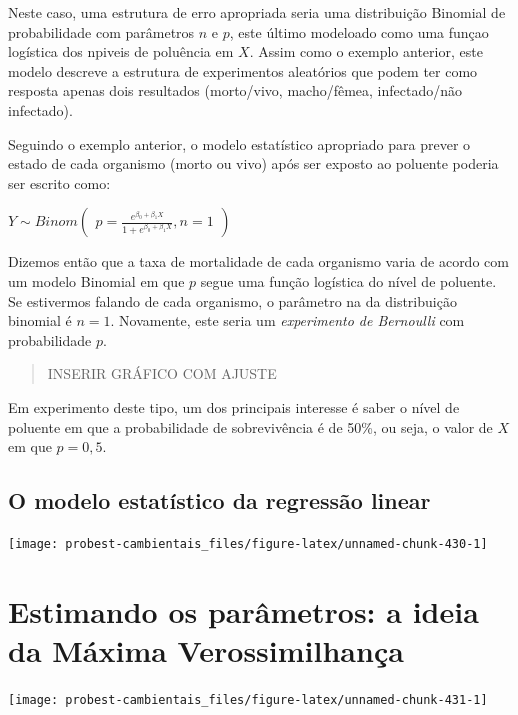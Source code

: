 \documentclass[
]{book}
\begin{document}
Neste caso, uma estrutura de erro apropriada seria uma distribuição Binomial de probabilidade com parâmetros \(n\) e \(p\), este último modeloado como uma funçao logística dos npiveis de poluência em \(X\). Assim como o exemplo anterior, este modelo descreve a estrutura de experimentos aleatórios que podem ter como resposta apenas dois resultados (morto/vivo, macho/fêmea, infectado/não infectado).

Seguindo o exemplo anterior, o modelo estatístico apropriado para prever o estado de cada organismo (morto ou vivo) após ser exposto ao poluente poderia ser escrito como:

\(Y ∼ Binom \left (\begin{array}{c} p = \frac{e^{\beta_0 + \beta_1 X}}{1 + e^{\beta_0 + \beta_1 X}}, n = 1 \end{array}\right)\)

Dizemos então que a taxa de mortalidade de cada organismo varia de acordo com um modelo Binomial em que \(p\) segue uma função logística do nível de poluente. Se estivermos falando de cada organismo, o parâmetro na da distribuição binomial é \(n = 1\). Novamente, este seria um \emph{experimento de Bernoulli} com probabilidade \(p\).

\begin{quote}
INSERIR GRÁFICO COM AJUSTE
\end{quote}

Em experimento deste tipo, um dos principais interesse é saber o nível de poluente em que a probabilidade de sobrevivência é de 50\%, ou seja, o valor de \(X\) em que \(p = 0,5\).

\hypertarget{o-modelo-estatuxedstico-da-regressuxe3o-linear}{%
\section{O modelo estatístico da regressão linear}\label{o-modelo-estatuxedstico-da-regressuxe3o-linear}}

\begin{center}\texttt{[image: probest-cambientais\_files/figure-latex/unnamed-chunk-430-1]} \end{center}

\hypertarget{emv}{%
\chapter{Estimando os parâmetros: a ideia da Máxima Verossimilhança}\label{emv}}

\begin{center}\texttt{[image: probest-cambientais\_files/figure-latex/unnamed-chunk-431-1]} \end{center}
\end{document}
